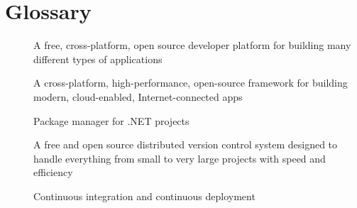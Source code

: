 \chapter*{Glossary}

\begin{description}
    \item [] A free, cross-platform, open source developer platform for building many different types of applications \cite{microsoft_what_2022}
    \item [] A cross-platform, high-performance, open-source framework for building modern, cloud-enabled, Internet-connected apps \cite{rick-anderson_overview_2022}
    \item [] Package manager for .NET projects \cite{microsoft_nuget_2022}
    \item [] A free and open source distributed version control system designed to handle everything from small to very large projects with speed and efficiency \cite{git_git_2022}
    \item [] Continuous integration and continuous deployment
\end{description}